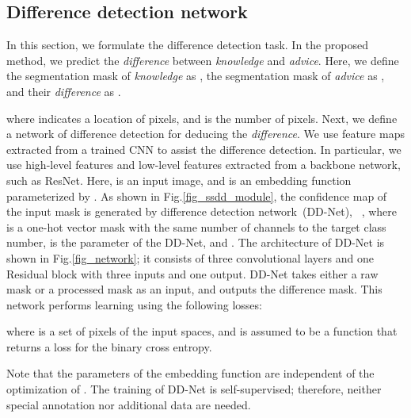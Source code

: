 \documentclass[10pt,twocolumn,letterpaper]{article}
\begin{document}
\subsection{Difference detection network}
In this section, we formulate the difference detection task.
In the proposed method, we predict the {\it difference} between {\it knowledge} and {\it advice}.
Here, we define the segmentation mask of {\it knowledge} as , the segmentation mask of {\it advice} as , and their {\it difference} as .

where  indicates a location of pixels, and  is the number of pixels.
Next, we define a network of difference detection for deducing the {\it difference}.
We use feature maps extracted from a trained CNN to assist the difference detection.
In particular, we use high-level features  and low-level features 
extracted from a backbone network, such as ResNet.
Here,  is an input image, and  is an embedding function parameterized by .
As shown in Fig.\ref{fig_ssdd_module}, 
the confidence map of the input mask  is generated by difference detection network~(DD-Net),
\footnotesize
~,
\normalsize
where 
 is a one-hot vector mask with the same number of channels to the target class number,  is the parameter of the DD-Net, and .
The architecture of DD-Net is shown in Fig.\ref{fig_network}; it consists of three convolutional 
layers and one Residual block with three inputs and one output.
DD-Net takes either a raw mask or a processed mask as an input, and outputs the difference mask.
This network performs learning using the following losses:

where  is a set of pixels of the input spaces, and  is assumed to be a function that returns a loss for the binary cross entropy.

Note that the parameters of the embedding function  are independent of the optimization of .
The training of DD-Net is self-supervised; therefore, neither special annotation nor additional data are needed.
\end{document}
